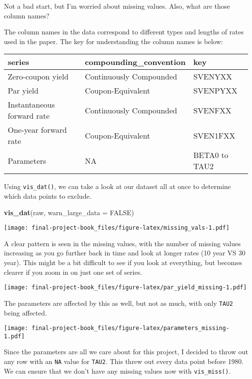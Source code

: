 \documentclass[]{book}
\newenvironment{Shaded}{\begin{snugshade}}{\end{snugshade}}
\newcommand{\DataTypeTok}[1]{\textcolor[rgb]{0.13,0.29,0.53}{#1}}
\newcommand{\KeywordTok}[1]{\textcolor[rgb]{0.13,0.29,0.53}{\textbf{#1}}}
\newcommand{\NormalTok}[1]{#1}
\newcommand{\OtherTok}[1]{\textcolor[rgb]{0.56,0.35,0.01}{#1}}
\begin{document}
Not a bad start, but I'm worried about missing values. Also, what are
those column names?

The column names in the data correspond to different types and lengths
of rates used in the paper. The key for understanding the column names
is below:

\begin{tabular}{l|l|l}
\hline
series & compounding\_convention & key\\
\hline
Zero-coupon yield & Continuously Compounded & SVENYXX\\
\hline
Par yield & Coupon-Equivalent & SVENPYXX\\
\hline
Instantaneous forward rate & Continuously Compounded & SVENFXX\\
\hline
One-year forward rate & Coupon-Equivalent & SVEN1FXX\\
\hline
Parameters & NA & BETA0 to TAU2\\
\hline
\end{tabular}

Using \texttt{vis\_dat()}, we can take a look at our dataset all at once
to determine which data points to exclude.

\begin{Shaded}
\begin{Highlighting}[]
\KeywordTok{vis_dat}\NormalTok{(raw, }\DataTypeTok{warn_large_data =} \OtherTok{FALSE}\NormalTok{)}
\end{Highlighting}
\end{Shaded}

\texttt{[image: final-project-book\_files/figure-latex/missing\_vals-1.pdf]}

A clear pattern is seen in the missing values, with the number of
missing values increasing as you go further back in time and look at
longer rates (10 year VS 30 year). This might be a bit difficult to see
if you look at everything, but becomes clearer if you zoom in on just
one set of series.

\texttt{[image: final-project-book\_files/figure-latex/par\_yield\_missing-1.pdf]}

The parameters are affected by this as well, but not as much, with only
\texttt{TAU2} being affected.

\texttt{[image: final-project-book\_files/figure-latex/parameters\_missing-1.pdf]}

Since the parameters are all we care about for this project, I decided
to throw out any row with an \texttt{NA} value for \texttt{TAU2}. This
threw out every data point before 1980. We can ensure that we don't have
any missing values now with \texttt{vis\_miss()}.
\end{document}

